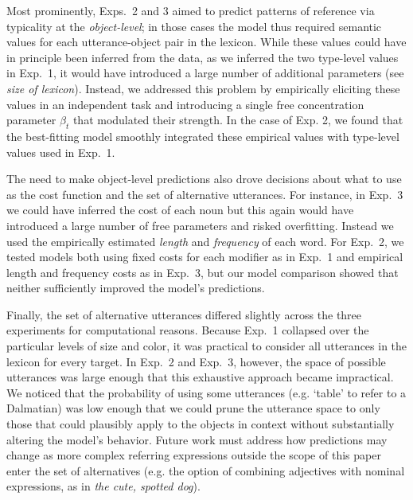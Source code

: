 \documentclass[11pt]{article}
\begin{document}
Most prominently, Exps.~2 and 3 aimed to predict patterns of reference via typicality at the \emph{object-level}; in those cases the model thus required semantic values for each utterance-object pair in the lexicon.
While these values could have in principle been inferred from the data, as we inferred the two type-level values in Exp.~1, it would have introduced a large number of additional parameters (see \emph{size of lexicon}). 
Instead, we addressed this problem by empirically eliciting these values in an independent task and introducing a single free concentration parameter $\beta_t$ that modulated their strength.
In the case of Exp. 2, we found that the best-fitting model smoothly integrated these empirical values with type-level values used in Exp.~1.

The need to make object-level predictions also drove decisions about what to use as the cost function and the set of alternative utterances.
For instance, in Exp.~3 we could have inferred the cost of each noun but this again would have introduced a large number of free parameters and risked overfitting. 
Instead we used the empirically estimated \emph{length} and \emph{frequency} of each word. 
For Exp.~2, we tested models both using fixed costs for each modifier as in Exp.~1 and empirical length and frequency costs as in Exp.~3, but our model comparison showed that neither sufficiently improved the model's predictions.

Finally, the set of alternative utterances differed slightly across the three experiments for computational reasons.
Because Exp.~1 collapsed over the particular levels of size and color, it was practical to consider all utterances in the lexicon for every target. 
In Exp.~2 and Exp.~3, however, the space of possible utterances was large enough that this exhaustive approach became impractical. 
We noticed that the probability of using some utterances (e.g. `table' to refer to a Dalmatian)  was low enough that we could prune the utterance space to only those that could plausibly apply to the objects in context without substantially altering the model's behavior.
Future work must address how predictions may change as more complex referring expressions outside the scope of this paper enter the set of alternatives (e.g. the option of combining adjectives with nominal expressions, as in \emph{the cute, spotted dog}).
\end{document}
